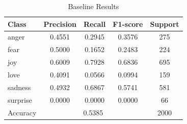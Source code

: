 \documentclass{article}
\begin{document}
\begin{table}[h]
\centering
\begin{tabular}{lcccc}
\hline
Class & Precision & Recall & F1-score & Support \\
\hline
anger & 0.4551 & 0.2945 & 0.3576 & 275 \\
fear & 0.5000 & 0.1652 & 0.2483 & 224 \\
joy & 0.6009 & 0.7928 & 0.6836 & 695 \\
love & 0.4091 & 0.0566 & 0.0994 & 159 \\
sadness & 0.4932 & 0.6867 & 0.5741 & 581 \\
surprise & 0.0000 & 0.0000 & 0.0000 & 66 \\
\hline
Accuracy & \multicolumn{3}{c}{0.5385} & 2000 \\
\hline
\end{tabular}
\caption{Baseline Results}
\end{table}
\end{document}
